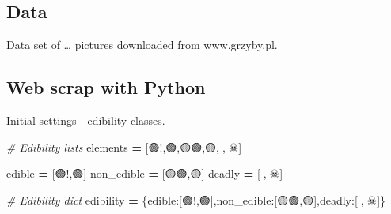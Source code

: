 \documentclass[
]{article}
\newenvironment{Shaded}{\begin{snugshade}}{\end{snugshade}}
\newcommand{\CommentTok}[1]{\textcolor[rgb]{0.56,0.35,0.01}{\textit{#1}}}
\newcommand{\NormalTok}[1]{#1}
\newcommand{\OperatorTok}[1]{\textcolor[rgb]{0.81,0.36,0.00}{\textbf{#1}}}
\newcommand{\StringTok}[1]{\textcolor[rgb]{0.31,0.60,0.02}{#1}}
\begin{document}
\hypertarget{data}{%
\subsection{Data}\label{data}}

Data set of \ldots{} pictures downloaded from www.grzyby.pl.

\hfill\break

\hypertarget{web-scrap-with-python}{%
\subsection{Web scrap with Python}\label{web-scrap-with-python}}

Initial settings - edibility classes.

\begin{Shaded}
\begin{Highlighting}[]
\CommentTok{\# Edibility lists}
\NormalTok{elements }\OperatorTok{=}\NormalTok{ [}\StringTok{\textquotesingle{}🟢!\textquotesingle{}}\NormalTok{,}\StringTok{\textquotesingle{}🟢\textquotesingle{}}\NormalTok{,}\StringTok{\textquotesingle{}🟡🟢\textquotesingle{}}\NormalTok{,}\StringTok{\textquotesingle{}🟡\textquotesingle{}}\NormalTok{,}\StringTok{\textquotesingle{}🔴\textquotesingle{}}\NormalTok{,}\StringTok{\textquotesingle{}🔴☠\textquotesingle{}}\NormalTok{]}

\NormalTok{edible }\OperatorTok{=}\NormalTok{ [}\StringTok{\textquotesingle{}🟢!\textquotesingle{}}\NormalTok{,}\StringTok{\textquotesingle{}🟢\textquotesingle{}}\NormalTok{]}
\NormalTok{non\_edible }\OperatorTok{=}\NormalTok{ [}\StringTok{\textquotesingle{}🟡🟢\textquotesingle{}}\NormalTok{,}\StringTok{\textquotesingle{}🟡\textquotesingle{}}\NormalTok{]}
\NormalTok{deadly }\OperatorTok{=}\NormalTok{ [}\StringTok{\textquotesingle{}🔴\textquotesingle{}}\NormalTok{,}\StringTok{\textquotesingle{}🔴☠\textquotesingle{}}\NormalTok{]}

\CommentTok{\# Edibility dict}
\NormalTok{edibility }\OperatorTok{=}\NormalTok{ \{}\StringTok{\textquotesingle{}edible\textquotesingle{}}\NormalTok{:[}\StringTok{\textquotesingle{}🟢!\textquotesingle{}}\NormalTok{,}\StringTok{\textquotesingle{}🟢\textquotesingle{}}\NormalTok{],}\StringTok{\textquotesingle{}non\_edible\textquotesingle{}}\NormalTok{:[}\StringTok{\textquotesingle{}🟡🟢\textquotesingle{}}\NormalTok{,}\StringTok{\textquotesingle{}🟡\textquotesingle{}}\NormalTok{],}\StringTok{\textquotesingle{}deadly\textquotesingle{}}\NormalTok{:[}\StringTok{\textquotesingle{}🔴\textquotesingle{}}\NormalTok{,}\StringTok{\textquotesingle{}🔴☠\textquotesingle{}}\NormalTok{]\}}
\end{Highlighting}
\end{Shaded}
\end{document}
